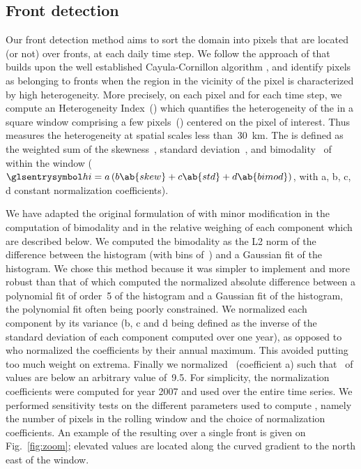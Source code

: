 \subsection{Front detection}

Our front detection method aims to sort the domain into pixels that are located (or not) over fronts, at each daily time step.
We follow the approach of \textcite{liu_2016} that builds upon the well established Cayula-Cornillon algorithm \parencite{cayula_1992, belkin_2009}, and identify pixels as belonging to fronts when the region in the vicinity of the pixel is characterized by high  heterogeneity.
More precisely, on each pixel and for each time step, we compute an Heterogeneity Index~() which quantifies the heterogeneity of the  in a square window comprising a few pixels~() centered on the pixel of interest.
Thus  measures the  heterogeneity at spatial scales less than~\qty{30}{\km}.
The  is defined as the weighted sum of the skewness~, standard deviation~, and bimodality~ of  within the window (\(\am{hi} = a \left( b \ab{skew} + c \ab{std} + d \ab{bimod} \right)\), with a, b, c, d constant normalization coefficients).

We have adapted the original formulation of \textcite{liu_2016} with minor modification in the computation of bimodality and in the relative weighing of each component which are described below.
We computed the bimodality as the L2 norm of the difference between the  histogram (with bins of~) and a Gaussian fit of the histogram.
We chose this method because it was simpler to implement and more robust than that of \textcite{liu_2016} which computed the normalized absolute difference between a polynomial fit of order~5 of the  histogram and a Gaussian fit of the histogram, the polynomial fit often being poorly constrained.
We normalized each component by its variance (b, c and d being defined as the inverse of the standard deviation of each component computed over one year), as opposed to \textcite{liu_2016} who normalized the coefficients by their annual maximum.
This avoided putting too much weight on extrema.
Finally we normalized ~(coefficient a) such that~ of values are below an arbitrary value of~\num{9.5}.
For simplicity, the normalization coefficients were computed for year 2007 and used over the entire time series.
We performed sensitivity tests on the different parameters used to compute , namely the number of pixels in the rolling window and the choice of normalization coefficients.
An example of the resulting  over a single front is given on Fig.~\ref{fig:zoom}; elevated  values are located along the curved  gradient to the north east of the window.

